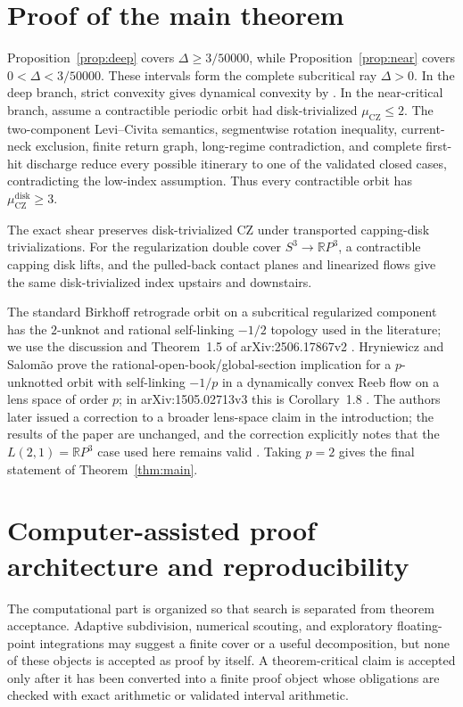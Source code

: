 \documentclass[11pt]{article}
\newcommand{\CZ}{\mu_{\mathrm{CZ}}}
\newcommand{\RP}{\mathbb{R}P}
\begin{document}
\section{Proof of the main theorem}\label{sec:assembly}
Proposition~\ref{prop:deep} covers $\Delta\ge3/50000$, while Proposition~\ref{prop:near} covers $0<\Delta<3/50000$. These intervals form the complete subcritical ray $\Delta>0$. In the deep branch, strict convexity gives dynamical convexity by \citep{HWZ1998}. In the near-critical branch, assume a contractible periodic orbit had disk-trivialized $\CZ\le2$. The two-component Levi--Civita semantics, segmentwise rotation inequality, current-neck exclusion, finite return graph, long-regime contradiction, and complete first-hit discharge reduce every possible itinerary to one of the validated closed cases, contradicting the low-index assumption. Thus every contractible orbit has $\CZ^{\mathrm{disk}}\ge3$.

The exact shear preserves disk-trivialized CZ under transported capping-disk trivializations. For the regularization double cover $S^3\to\RP^3$, a contractible capping disk lifts, and the pulled-back contact planes and linearized flows give the same disk-trivialized index upstairs and downstairs.

The standard Birkhoff retrograde orbit on a subcritical regularized component has the $2$-unknot and rational self-linking $-1/2$ topology used in the literature; we use the discussion and Theorem~1.5 of arXiv:2506.17867v2 \citep{LiuSalomao2025}. Hryniewicz and Salom\~ao prove the rational-open-book/global-section implication for a $p$-unknotted orbit with self-linking $-1/p$ in a dynamically convex Reeb flow on a lens space of order $p$; in arXiv:1505.02713v3 this is Corollary~1.8 \citep{HryniewiczSalomao2016}. The authors later issued a correction to a broader lens-space claim in the introduction; the results of the paper are unchanged, and the correction explicitly notes that the $L(2,1)=\mathbb{R}P^3$ case used here remains valid \citep{HryniewiczSalomaoErrata}. Taking $p=2$ gives the final statement of Theorem~\ref{thm:main}.

\section{Computer-assisted proof architecture and reproducibility}
The computational part is organized so that search is separated from theorem acceptance. Adaptive subdivision, numerical scouting, and exploratory floating-point integrations may suggest a finite cover or a useful decomposition, but none of these objects is accepted as proof by itself. A theorem-critical claim is accepted only after it has been converted into a finite proof object whose obligations are checked with exact arithmetic or validated interval arithmetic.
\end{document}
